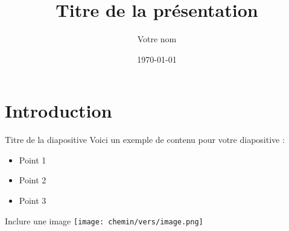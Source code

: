 \documentclass{beamer} %
\title{Titre de la présentation} %
\author{Votre nom}               %
\date{\today}                    %
\begin{document}
\frame{\titlepage} %

\section{Introduction} %

\begin{frame}{Titre de la diapositive} %
Voici un exemple de contenu pour votre diapositive :
\begin{itemize}
    \item Point 1
    \item Point 2
    \item Point 3
\end{itemize}
\end{frame}

\begin{frame}{Inclure une image}
\texttt{[image: chemin/vers/image.png]}
\end{frame}
\end{document}
